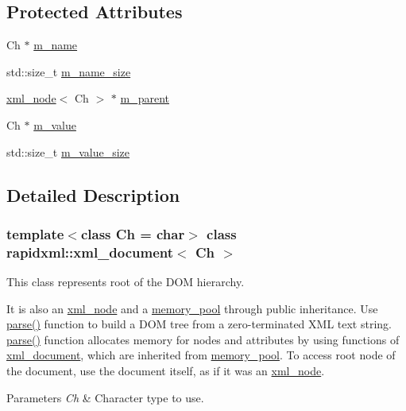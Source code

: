 \subsection*{Protected Attributes}
\begin{DoxyCompactItemize}
\item 
Ch $\ast$ \mbox{\hyperlink{classrapidxml_1_1xml__base_a23053aafada985ece680d52694c63cdc}{m\+\_\+name}}
\item 
std\+::size\+\_\+t \mbox{\hyperlink{classrapidxml_1_1xml__base_af67d7df13abd2eb30036a801b87d6f81}{m\+\_\+name\+\_\+size}}
\item 
\mbox{\hyperlink{classrapidxml_1_1xml__node}{xml\+\_\+node}}$<$ Ch $>$ $\ast$ \mbox{\hyperlink{classrapidxml_1_1xml__base_a1b2fdbb90cc0cc9135a8311c40d79bf9}{m\+\_\+parent}}
\item 
Ch $\ast$ \mbox{\hyperlink{classrapidxml_1_1xml__base_a8fbc9ba6b320f64f4bdab09469a9e623}{m\+\_\+value}}
\item 
std\+::size\+\_\+t \mbox{\hyperlink{classrapidxml_1_1xml__base_a643295fc68623ed58e2db3551d44fef0}{m\+\_\+value\+\_\+size}}
\end{DoxyCompactItemize}


\subsection{Detailed Description}
\subsubsection*{template$<$class Ch = char$>$\newline
class rapidxml\+::xml\+\_\+document$<$ Ch $>$}

This class represents root of the D\+OM hierarchy. 

It is also an \mbox{\hyperlink{classrapidxml_1_1xml__node}{xml\+\_\+node}} and a \mbox{\hyperlink{classrapidxml_1_1memory__pool}{memory\+\_\+pool}} through public inheritance. Use \mbox{\hyperlink{classrapidxml_1_1xml__document_aa280fd704731128b4556b41c1e9182b8}{parse()}} function to build a D\+OM tree from a zero-\/terminated X\+ML text string. \mbox{\hyperlink{classrapidxml_1_1xml__document_aa280fd704731128b4556b41c1e9182b8}{parse()}} function allocates memory for nodes and attributes by using functions of \mbox{\hyperlink{classrapidxml_1_1xml__document}{xml\+\_\+document}}, which are inherited from \mbox{\hyperlink{classrapidxml_1_1memory__pool}{memory\+\_\+pool}}. To access root node of the document, use the document itself, as if it was an \mbox{\hyperlink{classrapidxml_1_1xml__node}{xml\+\_\+node}}. 
\begin{DoxyParams}{Parameters}
{\em Ch} & Character type to use. \\
\hline
\end{DoxyParams}


